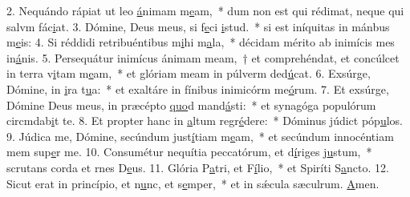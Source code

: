 2. Nequándo rápiat ut leo \uline{á}nimam m\uline{e}am,~* dum non est qui rédimat, neque qui salvm fác\uline{i}at.
3. Dómine, Deus meus, si f\uline{e}ci \uline{i}stud.~* si est iníquitas in mánbus m\uline{e}is:
4. Si réddidi retribuéntibus m\uline{i}hi m\uline{a}la,~* décidam mérito ab inimícis mes in\uline{á}nis.
5. Persequátur inimícus ánimam meam,~† et comprehéndat, et concúlcet in terra v\uline{i}tam m\uline{e}am,~* et glóriam meam in púlverm ded\uline{ú}cat.
6. Exsúrge, Dómine, in \uline{i}ra t\uline{u}a:~* et exaltáre in fínibus inimicórm me\uline{ó}rum.
7. Et exsúrge, Dómine Deus meus, in præcépto \uline{quo}d mand\uline{á}sti:~* et synagóga populórum circmdab\uline{i}t te.
8. Et propter hanc in \uline{a}ltum regr\uline{é}dere:~* Dóminus júdict póp\uline{u}los.
9. Júdica me, Dómine, secúndum just\uline{í}tiam m\uline{e}am,~* et secúndum innocéntiam mem sup\uline{e}r me.
10. Consumétur nequítia peccatórum, et d\uline{í}riges j\uline{u}stum,~* scrutans corda et rnes D\uline{e}us.
11. Glória P\uline{a}tri, et F\uline{í}lio,~* et Spiríti S\uline{a}ncto.
12. Sicut erat in princípio, et n\uline{u}nc, et s\uline{e}mper,~* et in sǽcula sæculrum. \uline{A}men.
